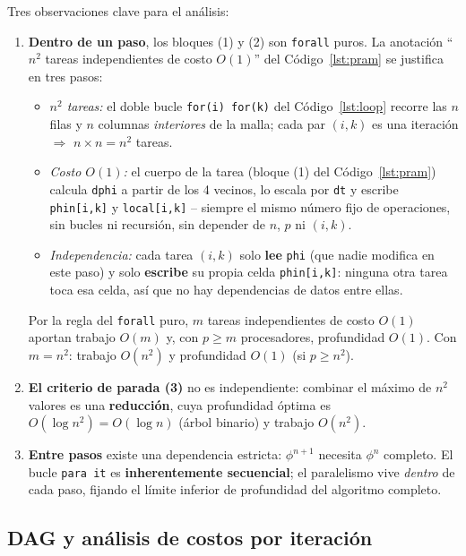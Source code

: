 \documentclass[11pt,a4paper]{article}
\begin{document}
	Tres observaciones clave para el análisis:
	\enlargethispage{4 \baselineskip}
	\begin{enumerate}
		\item \textbf{Dentro de un paso}, los bloques (1) y (2) son \texttt{forall}
		puros. La anotación ``$n^2$ tareas independientes de costo $O(1)$'' del
		Código~\ref{lst:pram} se justifica en tres pasos:
		\begin{itemize}[itemsep=2pt, topsep=2pt, parsep=0pt, leftmargin=1.3em]
			\item \textit{$n^2$ tareas:} el doble bucle \texttt{for(i)\,for(k)} del
			Código~\ref{lst:loop} recorre las $n$ filas y $n$ columnas
			\textit{interiores} de la malla; cada par $(i,k)$ es una iteración
			$\Rightarrow$ $n\times n=n^2$ tareas.
			\item \textit{Costo $O(1)$:} el cuerpo de la tarea (bloque (1) del
			Código~\ref{lst:pram}) calcula \texttt{dphi} a partir de los 4 vecinos,
			lo escala por \texttt{dt} y escribe \texttt{phin[i,k]} y
			\texttt{local[i,k]} -- siempre el mismo número fijo de operaciones,
			sin bucles ni recursión, sin depender de $n$, $p$ ni $(i,k)$.
			\item \textit{Independencia:} cada tarea $(i,k)$ solo \textbf{lee}
			\texttt{phi} (que nadie modifica en este paso) y solo
			\textbf{escribe} su propia celda \texttt{phin[i,k]}: ninguna otra
			tarea toca esa celda, así que no hay dependencias de datos entre
			ellas.
		\end{itemize}
		Por la regla del \texttt{forall} puro, $m$ tareas independientes de
		costo $O(1)$ aportan trabajo $O(m)$ y, con $p\ge m$ procesadores,
		profundidad $O(1)$. Con $m=n^2$: trabajo $O(n^2)$ y profundidad $O(1)$
		(si $p\ge n^2$).
		\item \textbf{El criterio de parada (3)} no es independiente: combinar el
		máximo de $n^2$ valores es una \textbf{reducción}, cuya profundidad óptima es
		$O(\log n^2)=O(\log n)$ (árbol binario) y trabajo $O(n^2)$.
		\item \textbf{Entre pasos} existe una dependencia estricta: $\phi^{n+1}$
		necesita $\phi^{n}$ completo. El bucle \texttt{para it} es
		\textbf{inherentemente secuencial}; el paralelismo vive \textit{dentro} de
		cada paso, fijando el límite inferior de profundidad del algoritmo completo.
	\end{enumerate}

	\subsection{DAG y análisis de costos por iteración}
	\label{sec:dag}
\end{document}
